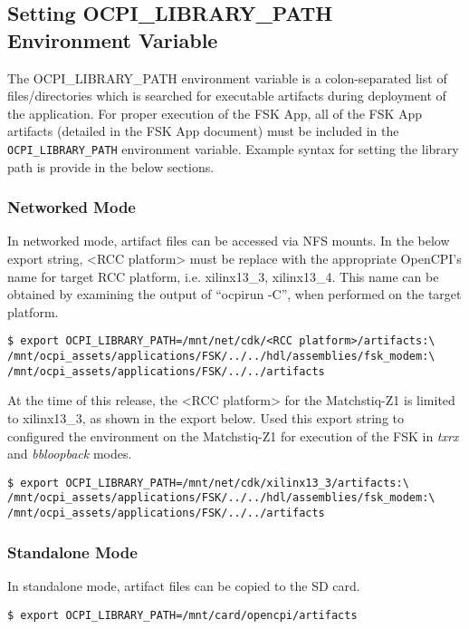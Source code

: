 \begin{flushleft}
\subsection{Setting OCPI\_LIBRARY\_PATH Environment Variable}
The OCPI\_LIBRARY\_PATH environment variable is a colon-separated list of files/directories which is searched for executable artifacts during deployment of the application. For proper execution of the FSK App, all of the FSK App artifacts (detailed in the FSK App document) must be included in the \texttt{OCPI\_LIBRARY\_PATH} environment variable. Example syntax for setting the library path is provide in the below sections.
\subsubsection{Networked Mode}
In networked mode, artifact files can be accessed via NFS mounts. In the below export string, <RCC platform> must be replace with the appropriate OpenCPI's name for target RCC platform, i.e. xilinx13\_3, xilinx13\_4. This name can be obtained by examining the output of ``ocpirun -C'', when performed on the target platform.
\begin{verbatim}
$ export OCPI_LIBRARY_PATH=/mnt/net/cdk/<RCC platform>/artifacts:\
/mnt/ocpi_assets/applications/FSK/../../hdl/assemblies/fsk_modem:\
/mnt/ocpi_assets/applications/FSK/../../artifacts
\end{verbatim}

At the time of this release, the <RCC platform> for the Matchstiq-Z1 is limited to xilinx13\_3, as shown in the export below. Used this export string to configured the environment on the Matchstiq-Z1 for execution of the FSK in \textit{txrx} and \textit{bbloopback} modes.
\begin{verbatim}
$ export OCPI_LIBRARY_PATH=/mnt/net/cdk/xilinx13_3/artifacts:\
/mnt/ocpi_assets/applications/FSK/../../hdl/assemblies/fsk_modem:\
/mnt/ocpi_assets/applications/FSK/../../artifacts
\end{verbatim}


\subsubsection{Standalone Mode}
In standalone mode, artifact files can be copied to the SD card.
\begin{verbatim}
$ export OCPI_LIBRARY_PATH=/mnt/card/opencpi/artifacts
\end{verbatim}

\end{flushleft}
